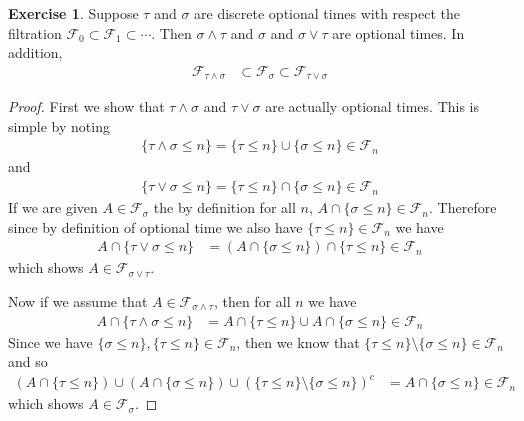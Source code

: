 \documentclass{amsbook}
\theoremstyle{definition}
\newtheorem{xca}{Exercise}
\theoremstyle{remark}
\begin{document}
\begin{xca}Suppose $\tau$ and $\sigma$ are discrete optional
  times with respect the filtration $\mathcal{F}_0 \subset
  \mathcal{F}_1 \subset \cdots$. Then $\sigma \wedge \tau$ and
  $\sigma$ and $\sigma \vee \tau$ are optional times.  In addition, 
\begin{align*}
\mathcal{F}_{\tau \wedge
    \sigma} &\subset \mathcal{F}_\sigma \subset \mathcal{F}_{\tau \vee
    \sigma}
\end{align*}
\end{xca}
\begin{proof}
First we show that $\tau \wedge \sigma$ and $\tau \vee \sigma$ are
actually optional times.  This is simple by noting
\begin{align*}
\lbrace \tau \wedge \sigma \leq n \rbrace = \lbrace \tau \leq n
\rbrace \cup \lbrace \sigma \leq n \rbrace \in \mathcal{F}_n
\end{align*}
and
\begin{align*}
\lbrace \tau \vee \sigma \leq n \rbrace = \lbrace \tau \leq n
\rbrace \cap \lbrace \sigma \leq n \rbrace \in \mathcal{F}_n
\end{align*}
If we are given $A \in \mathcal{F}_\sigma$ the by definition for all
$n$, $A \cap \lbrace \sigma \leq n \rbrace \in \mathcal{F}_n$.
Therefore since by definition of optional time we also have $\lbrace
\tau \leq n \rbrace \in \mathcal{F}_n$ we have
\begin{align*}
A \cap \lbrace \tau \vee \sigma \leq n \rbrace &= (A \cap \lbrace \sigma \leq n
\rbrace) \cap \lbrace \tau \leq n \rbrace \in \mathcal{F}_n
\end{align*}
which shows $A \in \mathcal{F}_{\sigma \vee \tau}$.

Now if we assume that $A \in \mathcal{F}_{\sigma \wedge \tau}$, then
for all $n$ we have
\begin{align*}
A \cap \lbrace \tau \wedge \sigma \leq n \rbrace &= A \cap \lbrace \tau \leq n
\rbrace \cup A \cap \lbrace \sigma \leq n \rbrace \in \mathcal{F}_n
\end{align*}
Since we have $\lbrace \sigma \leq n \rbrace, \lbrace \tau \leq n
\rbrace \in \mathcal{F}_n$, then we know that $\lbrace \tau \leq n
\rbrace \setminus \lbrace \sigma \leq n\rbrace \in \mathcal{F}_n$ and
so 
\begin{align*}
\left( A \cap \lbrace \tau \leq n
\rbrace \right ) \cup \left (A \cap \lbrace \sigma \leq n \rbrace
\right ) \cup \left ( \lbrace \tau \leq n
\rbrace \setminus \lbrace \sigma \leq n\rbrace\right)^c &= A \cap \lbrace \sigma \leq n
\rbrace \in \mathcal{F}_n
\end{align*}
which shows $A \in \mathcal{F}_\sigma$.
\end{proof}
\end{document}
